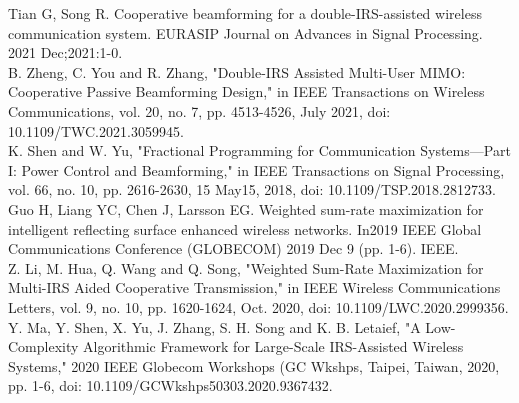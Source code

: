 \documentclass[11pt,twocolumn,twoside]{opticajnl}
\begin{document}
\begin{thebibliography}{1}
Tian G, Song R. Cooperative beamforming for a double-IRS-assisted wireless communication system. EURASIP Journal on Advances in Signal Processing. 2021 Dec;2021:1-0.
\\
B. Zheng, C. You and R. Zhang, "Double-IRS Assisted Multi-User MIMO: Cooperative Passive Beamforming Design," in IEEE Transactions on Wireless Communications, vol. 20, no. 7, pp. 4513-4526, July 2021, doi: 10.1109/TWC.2021.3059945.
\\
K. Shen and W. Yu, "Fractional Programming for Communication Systems—Part I: Power Control and Beamforming," in IEEE Transactions on Signal Processing, vol. 66, no. 10, pp. 2616-2630, 15 May15, 2018, doi: 10.1109/TSP.2018.2812733.
\\
Guo H, Liang YC, Chen J, Larsson EG. Weighted sum-rate maximization for intelligent reflecting surface enhanced wireless networks. In2019 IEEE Global Communications Conference (GLOBECOM) 2019 Dec 9 (pp. 1-6). IEEE.
\\
Z. Li, M. Hua, Q. Wang and Q. Song, "Weighted Sum-Rate Maximization for Multi-IRS Aided Cooperative Transmission," in IEEE Wireless Communications Letters, vol. 9, no. 10, pp. 1620-1624, Oct. 2020, doi: 10.1109/LWC.2020.2999356.
\\
Y. Ma, Y. Shen, X. Yu, J. Zhang, S. H. Song and K. B. Letaief, "A Low-Complexity Algorithmic Framework for Large-Scale IRS-Assisted Wireless Systems," 2020 IEEE Globecom Workshops (GC Wkshps, Taipei, Taiwan, 2020, pp. 1-6, doi: 10.1109/GCWkshps50303.2020.9367432.
\\
\end{thebibliography}
\end{document}

